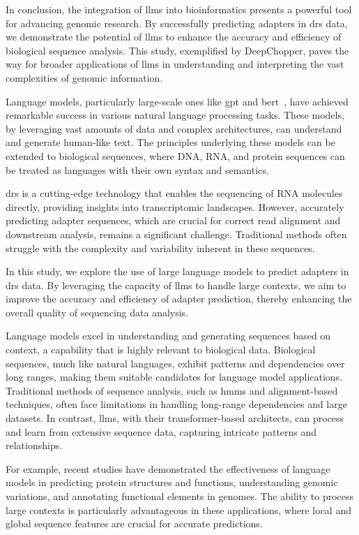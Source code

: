 \documentclass[pdflatex, sn-mathphys-num, lineno]{sn-jnl}%
\newcommand{\chopper}{DeepChopper\xspace}
\theoremstyle{thmstyleone}%
\theoremstyle{thmstyletwo}%
\theoremstyle{thmstylethree}%
\begin{document}
In conclusion, the integration of \glspl{llm} into bioinformatics presents a powerful tool for advancing genomic research.
By successfully predicting adapters in \gls{drs} data, we demonstrate the potential of \glspl{llm} to enhance the accuracy and efficiency of biological sequence analysis.
This study, exemplified by \chopper, paves the way for broader applications of \glspl{llm} in understanding and interpreting the vast complexities of genomic information.

Language models, particularly large-scale ones like \gls{gpt} and \gls{bert}~\cite{devlin2018bert}, have achieved remarkable success in various natural language processing tasks.
These models, by leveraging vast amounts of data and complex architectures, can understand and generate human-like text.
The principles underlying these models can be extended to biological sequences, where DNA, RNA, and protein sequences can be treated as languages with their own syntax and semantics.

\gls{drs} is a cutting-edge technology that enables the sequencing of RNA molecules directly, providing insights into transcriptomic landscapes.
However, accurately predicting adapter sequences, which are crucial for correct read alignment and downstream analysis, remains a significant challenge.
Traditional methods often struggle with the complexity and variability inherent in these sequences.

In this study, we explore the use of large language models to predict adapters in \gls{drs} data.
By leveraging the capacity of \glspl{llm} to handle large contexts, we aim to improve the accuracy and efficiency of adapter prediction, thereby enhancing the overall quality of sequencing data analysis.


Language models excel in understanding and generating sequences based on context, a capability that is highly relevant to biological data.
Biological sequences, much like natural languages, exhibit patterns and dependencies over long ranges, making them suitable candidates for language model applications.
Traditional methods of sequence analysis, such as \glspl{hmm} and alignment-based techniques, often face limitations in handling long-range dependencies and large datasets.
In contrast, \glspl{llm}, with their transformer-based architects, can process and learn from extensive sequence data, capturing intricate patterns and relationships.

For example, recent studies have demonstrated the effectiveness of language models in predicting protein structures and functions, understanding genomic variations, and annotating functional elements in genomes.
The ability to process large contexts is particularly advantageous in these applications, where local and global sequence features are crucial for accurate predictions.
\end{document}
